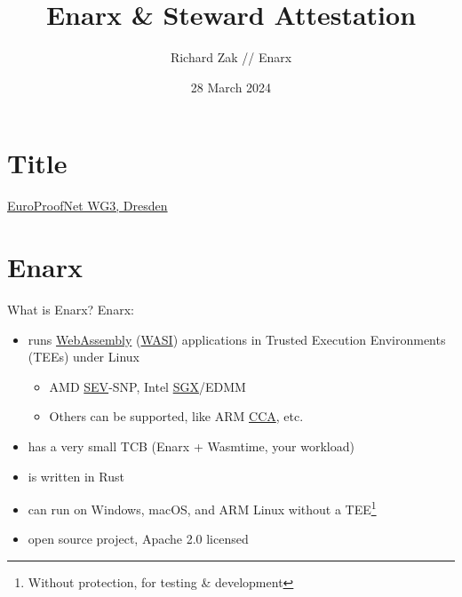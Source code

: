\documentclass[graphics,compress]{beamer}
\title{Enarx \& Steward Attestation}
\author{Richard Zak // Enarx}
\date{28 March 2024}
\begin{document}
\section*{Title}
\begin{frame}
\maketitle
\centering
\href{https://europroofnet.github.io/wg3-dresden24/}{EuroProofNet WG3, Dresden}
\vspace{2.2cm}
\end{frame}

\frame{\tableofcontents}

\section{Enarx}
\begin{frame}{What is Enarx?}
        Enarx:
        \begin{itemize}
        \item runs \href{https://webassembly.org}{WebAssembly} (\href{https://wasi.dev}{WASI}) applications in Trusted Execution Environments (TEEs) under Linux
        \begin{itemize}
        \item AMD \href{https://www.amd.com/de/developer/sev.html}{SEV}-SNP, Intel \href{https://www.intel.com/content/www/us/en/products/docs/accelerator-engines/software-guard-extensions.html}{SGX}/EDMM
        \item Others can be supported, like ARM \href{https://www.arm.com/architecture/security-features/arm-confidential-compute-architecture}{CCA}, etc.
        \end{itemize}
        \item has a very small TCB (Enarx + Wasmtime, your workload)
        \item is written in Rust
        \item can run on Windows, macOS, and ARM Linux without a TEE\footnote{Without protection, for testing \& development}
        \item open source project, Apache 2.0 licensed
        \end{itemize}
\end{frame}
\end{document}
